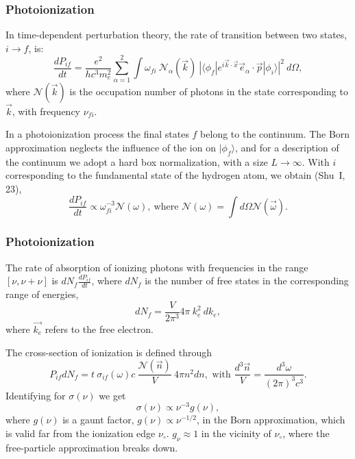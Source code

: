 \begin{frame}\frametitle{Photoionization}


In time-dependent perturbation theory, the rate of transition between
two states, $i\rightarrow f $, is:
\[
\frac{dP_{if}}{dt} = \frac{e^2}{h c^3 m_e^2} \sum_{\alpha = 1}^2 \int
\omega_{fi} ~\mathcal{N}_{\alpha}(\vec{k}) ~| \langle \phi_f |
e^{i\vec{k}\cdot\vec{x} } \vec{e}_{\alpha} \cdot \vec{p} | \phi_i
\rangle |^2 ~d\Omega,
\]   
where $\mathcal{N}(\vec{k})$ is the occupation number of photons in
the state corresponding to  $\vec{k}$,
with frequency  $\nu_{fi}$.

In a photoionization process the final states $f$ belong to the
continuum. The Born approximation neglects the influence of the ion on
$|\phi_f\rangle$, and for a description of the continuum we adopt a hard
box normalization, with a size  $L \rightarrow
\infty$. With  $i$ corresponding to the fundamental state of the
hydrogen atom, we obtain (Shu~I, 23),
\[
\frac{dP_{if}}{dt} \propto \omega_{fi}^{-3} \mathcal{N}(\omega),
~\text{where } \mathcal{N}(\omega) = \int d\Omega
\mathcal{N}(\vec{\omega}) .
\]

\end{frame}
\begin{frame}\frametitle{Photoionization}



The rate of absorption of ionizing photons with frequencies in the
range $[\nu,\nu+\nu]$ is $ dN_f \frac{dP_{if}}{dt} $, where $dN_f$ is
the number of free states in the corresponding range of energies,
\[ 
dN_f = \frac{V}{2\pi^3} 4\pi~k_e^2 ~dk_e,
\]
where $\vec{k_e}$ refers to the free electron.

The cross-section of ionization is defined through
\[
P_{if} dN_f =  t~\sigma_{if}(\omega) c ~\frac{\mathcal{N}(\vec{n})}{V}
 ~4\pi n^2 dn , \text{~with } \frac{d^3\vec{n}}{V} =
\frac{d^3\omega}{(2\pi)^3 c^3}.
\]
Identifying for $\sigma(\nu)$ we get
\[
\sigma(\nu) \propto \nu^{-3}  g(\nu),
\]
where $g(\nu)$ is a gaunt factor, $g(\nu) \propto \nu^{-1/2} $, in the
Born approximation, which is valid far from the ionization edge
$\nu_\circ$. $g_\nu \approx 1 $ in the vicinity of $\nu_\circ$, where
the free-particle approximation breaks down.

\end{frame}
